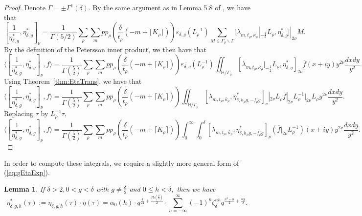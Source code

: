 \documentclass[10pt]{amsart}
\newtheorem{lemma}[theorem]{Lemma}
\theoremstyle{definition}
\theoremstyle{remark}
\numberwithin{equation}{section}
\newcommand{\lam}{\lambda}
\begin{document}
	\begin{proof}
		Denote $\Gamma=\pm\Gamma^1(\delta).$ By the same argument as in Lemma 5.8 of \cite{Gomez}, we have that
		$$
		[\frac{1}{\eta_{\delta,g}^\ast},\eta_{\delta,g}^\ast]_\nu = \frac{1}{\Gamma(5/2)}\sum\limits_\rho\sum\limits_m pp_\rho\left(\frac{\delta}{t_\rho}(-m+\lceil K_\rho\rceil)\right)\overline{\varepsilon_{\delta,g}}(L_\rho^{-1})\sum\limits_{M\in\Gamma_\rho\backslash\Gamma}[\lam_{m,t_\rho,\widetilde{\kappa_\rho}}|_{-\frac{1}{2}}L_\rho,\eta_{\delta,g}^\ast]|_{2\nu}M.
		$$
		By the definition of the Petersson inner product, we then have that
		$$
		\langle[\frac{1}{\eta_{\delta,g}^\ast},\eta_{\delta,g}^\ast]_\nu,f\rangle = \frac{1}{\Gamma(\frac{5}{2})}\sum\limits_\rho\sum\limits_m pp_\rho\left(\frac{\delta}{t_\rho}(-m+\lceil K_\rho\rceil)\right)\overline{\varepsilon_{\delta,g}}(L_\rho^{-1})\iint_{\mathbb{H}/\Gamma_\rho}[\lam_{m,t_\rho,\widetilde{\kappa_\rho}}|_{-\frac{1}{2}}L_\rho,\eta_{\delta,g}^\ast]_{2\nu}\overline{f}(x+iy)y^{2\nu}\frac{dxdy}{y^2}.
		$$
		Using Theorem~\ref{thm:EtaTrans}, we have that
		$$
		\langle[\frac{1}{\eta_{\delta,g}^\ast},\eta_{\delta,g}^\ast]_\nu,f\rangle =\frac{1}{\Gamma(\frac{5}{2})}\sum\limits_\rho\sum\limits_m pp_\rho\left(\frac{\delta}{t_\rho}(-m+\lceil K_\rho\rceil)\right)\iint_{\mathbb{H}/\Gamma_\rho}[\lam_{m,t_\rho,\widetilde{\kappa_\rho}},\eta_{\delta,h_\rho g, -f_\rho g}^\ast]_{\nu}|_{2\nu}L_\rho\overline{f}|_{2\nu} L_\rho^{-1}|_{2\nu}L_\rho y^{2\nu}\frac{dxdy}{y^2}.
		$$
		Replacing $\tau$ by $L_\rho^{-1}\tau,$ 
		$$
		\langle[\frac{1}{\eta_{\delta,g}^\ast},\eta_{\delta,g}^\ast]_\nu,f\rangle = \frac{1}{\Gamma(\frac{5}{2})}\sum\limits_\rho\sum\limits_m pp_\rho\left(\frac{\delta}{t_\rho}(-m+\lceil K_\rho\rceil)\right)\int_0^\infty\int_0^\delta[\lam_{m,t_\rho,\widetilde{\kappa_\rho}},\eta_{\delta,h_\rho g, -f_\rho g}^\ast]_{\nu}(\overline{f}|_{2\nu}L_{\rho}^{-1})(x+iy)y^{2\nu}\frac{dxdy}{y^2}.
		$$
	\end{proof}
	
		In order to compute these integrals, we require a slightly more general form of (\ref{eq:gEtaExp}).
	
	\begin{lemma}\label{lem:EulerPentagGen}
		If $\delta>2, 0<g<\delta$ with $g\neq\frac{\delta}{2}$ and $0\leq h<\delta,$ then we have
		$$
		\eta_{\delta,g,h}^\ast(\tau):=\eta_{\delta,g,h}(\tau)\cdot\eta(\tau)=\alpha_0(h)\cdot q^{\frac{1}{24}+\frac{P_2(\frac{g}{\delta})}{2}}\cdot\sum\limits_{n=-\infty}^{\infty} (-1)^n\zeta_\delta^{nh}q^{\frac{n^2-n}{2}+\frac{ng}{\delta}}.
		$$
	\end{lemma}
	
\end{document}
